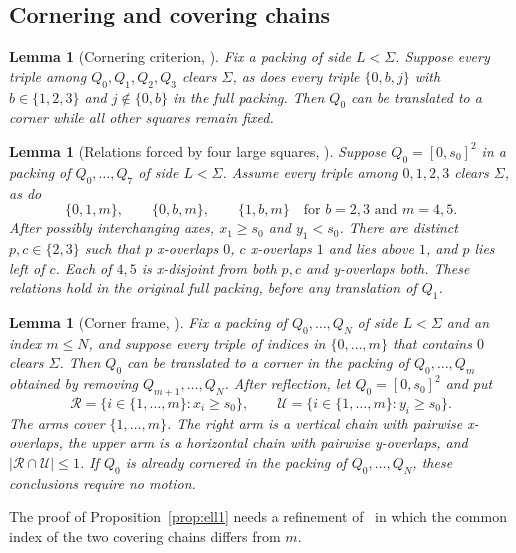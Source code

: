 \documentclass[12pt]{amsart}
\newtheorem{lemma}[theorem]{Lemma}
\theoremstyle{definition}
\theoremstyle{remark}
\numberwithin{equation}{section}
\numberwithin{figure}{section}
\numberwithin{table}{section}
\begin{document}
\subsection{Cornering and covering chains}
\begin{lemma}[Cornering criterion, {\cite[Lemma~3.5]{BadgerSeven}}]\label{lem:pane}
Fix a packing of side $L<\Sigma$. Suppose every triple among
$Q_0,Q_1,Q_2,Q_3$ clears $\Sigma$, as does every triple $\{0,b,j\}$ with
$b\in\{1,2,3\}$ and $j\notin\{0,b\}$ in the full packing.
Then $Q_0$ can be translated to a corner while all other squares remain fixed.
\end{lemma}
\begin{lemma}[Relations forced by four large squares, {\cite[Lemma~3.6]{BadgerSeven}}]\label{lem:fixed-core}
Suppose $Q_0=[0,s_0]^2$ in a packing of $Q_0,\ldots,Q_7$ of side
$L<\Sigma$. Assume every triple among $0,1,2,3$ clears $\Sigma$, as do
\[
\{0,1,m\},\qquad \{0,b,m\},\qquad \{1,b,m\}
\quad\text{for }b=2,3\text{ and }m=4,5.
\]
After possibly interchanging axes, $x_1\ge s_0$ and $y_1<s_0$.
There are distinct $p,c\in\{2,3\}$ such that $p$ x-overlaps $0$,
$c$ x-overlaps $1$ and lies above $1$, and $p$ lies left of $c$.
Each of $4,5$ is x-disjoint from both $p,c$ and y-overlaps both.
These relations hold in the original full packing, before any translation of $Q_1$.
\end{lemma}
\begin{lemma}[Corner frame, {\cite[Lemma~5.2]{BadgerSeven}}]\label{lem:full-frame}
Fix a packing of $Q_0,\ldots,Q_N$ of side $L<\Sigma$ and an index
$m\le N$, and suppose every triple of indices in $\{0,\ldots,m\}$ that
contains $0$ clears $\Sigma$. Then $Q_0$ can be translated to a corner in the
packing of $Q_0,\ldots,Q_m$ obtained by removing $Q_{m+1},\ldots,Q_N$. After reflection,
let $Q_0=[0,s_0]^2$ and put
\[
\mathcal R=\{i\in\{1,\ldots,m\}:x_i\ge s_0\},\qquad
\mathcal U=\{i\in\{1,\ldots,m\}:y_i\ge s_0\}.
\]
The arms cover $\{1,\ldots,m\}$. The right arm is a vertical chain with
pairwise x-overlaps, the upper arm is a horizontal chain with
pairwise y-overlaps, and $|\mathcal R\cap\mathcal U|\le1$.
If $Q_0$ is already cornered in the packing of $Q_0,\ldots,Q_N$, these
conclusions require no motion.
\end{lemma}
The proof of Proposition~\ref{prop:ell1} needs a refinement
of~\cite[Lemma~5.3]{BadgerSeven} in which the common index of the two
covering chains differs from $m$.
\end{document}

